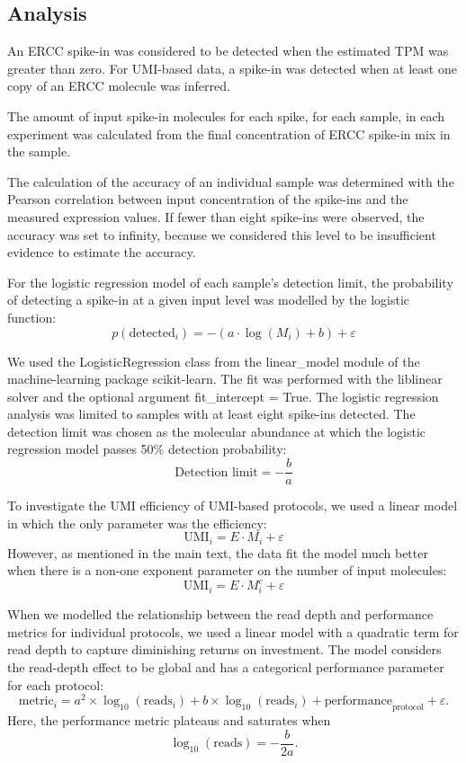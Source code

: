 \subsection{Analysis}

An ERCC spike-in was considered to be detected when the estimated TPM was greater than zero. For UMI-based data, a spike-in was detected when at least one copy of an ERCC molecule was inferred.

The amount of input spike-in molecules for each spike, for each sample, in each experiment was calculated from the final concentration of ERCC spike-in mix in the sample.

The calculation of the accuracy of an individual sample was determined with the Pearson correlation between input concentration of the spike-ins and the measured expression values. If fewer than eight spike-ins were observed, the accuracy was set to infinity, because we considered this level to be insufficient evidence to estimate the accuracy.

For the logistic regression model of each sample’s detection limit, the probability of detecting a spike-in at a given input level was modelled by the logistic function:
\[
    p(\text{detected}_i)= -(a \cdot \log(M_i) + b) + \varepsilon
\]

We used the LogisticRegression class from the linear\_model module of the machine-learning package scikit-learn. The fit was performed with the liblinear solver and the optional argument fit\_intercept = True. The logistic regression analysis was limited to samples with at least eight spike-ins detected. The detection limit was chosen as the molecular abundance at which the logistic regression model passes 50\% detection probability:
\[
    \text{Detection limit} = -\frac{b}{a}
\]

To investigate the UMI efficiency of UMI-based protocols, we used a linear model in which the only parameter was the efficiency:
\[
    \text{UMI}_i = E \cdot M_i + \varepsilon
\]
However, as mentioned in the main text, the data fit the model much better when there is a non-one exponent parameter on the number of input molecules:
\[
    \text{UMI}_i = E \cdot M_i^c + \varepsilon
\]

When we modelled the relationship between the read depth and performance metrics for individual protocols, we used a linear model with a quadratic term for read depth to capture diminishing returns on investment. The model considers the read-depth effect to be global and has a categorical performance parameter for each protocol:
\[
\text{metric}_i = a^2 \times \log_{10}(\text{reads}_i) + b \times \log_{10}(\text{reads}_i) +  \text{performance}_\text{protocol} + \varepsilon.
\]
Here, the performance metric plateaus and saturates when
\[
\log_{10} (\text{reads}) = - \frac{b}{2a}.
\]

